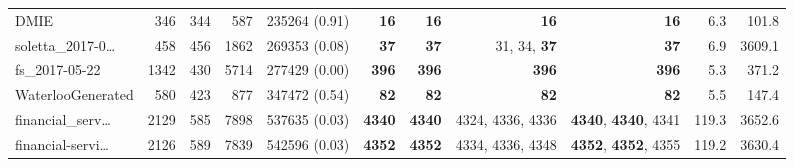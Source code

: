 \begin{table*}
\begin{tiny}
{{\begin{tabular}{lrrrrrrrrrr}
DMIE & \num[text-series-to-math=true]{346} & \num[text-series-to-math=true]{344} & \num[text-series-to-math=true]{587} & \num[text-series-to-math=true]{235264} (\num[text-series-to-math=true]{0.91}) & \textbf{\num[text-series-to-math=true]{16}} & \textbf{\num[text-series-to-math=true]{16}} & \textbf{\num[text-series-to-math=true]{16}} & \textbf{\num[text-series-to-math=true]{16}} & 6.3 & 101.8\\
soletta\_2017-0\ldots & \num[text-series-to-math=true]{458} & \num[text-series-to-math=true]{456} & \num[text-series-to-math=true]{1862} & \num[text-series-to-math=true]{269353} (\num[text-series-to-math=true]{0.08}) & \textbf{\num[text-series-to-math=true]{37}} & \textbf{\num[text-series-to-math=true]{37}} & \num[text-series-to-math=true]{31}, \num[text-series-to-math=true]{34}, \textbf{\num[text-series-to-math=true]{37}} & \textbf{\num[text-series-to-math=true]{37}} & 6.9 & 3609.1\\
fs\_2017-05-22 & \num[text-series-to-math=true]{1342} & \num[text-series-to-math=true]{430} & \num[text-series-to-math=true]{5714} & \num[text-series-to-math=true]{277429} (\num[text-series-to-math=true]{0.00}) & \textbf{\num[text-series-to-math=true]{396}} & \textbf{\num[text-series-to-math=true]{396}} & \textbf{\num[text-series-to-math=true]{396}} & \textbf{\num[text-series-to-math=true]{396}} & 5.3 & 371.2\\
WaterlooGenerated & \num[text-series-to-math=true]{580} & \num[text-series-to-math=true]{423} & \num[text-series-to-math=true]{877} & \num[text-series-to-math=true]{347472} (\num[text-series-to-math=true]{0.54}) & \textbf{\num[text-series-to-math=true]{82}} & \textbf{\num[text-series-to-math=true]{82}} & \textbf{\num[text-series-to-math=true]{82}} & \textbf{\num[text-series-to-math=true]{82}} & 5.5 & 147.4\\
financial\_serv\ldots & \num[text-series-to-math=true]{2129} & \num[text-series-to-math=true]{585} & \num[text-series-to-math=true]{7898} & \num[text-series-to-math=true]{537635} (\num[text-series-to-math=true]{0.03}) & \textbf{\num[text-series-to-math=true]{4340}} & \textbf{\num[text-series-to-math=true]{4340}} & \num[text-series-to-math=true]{4324}, \num[text-series-to-math=true]{4336}, \num[text-series-to-math=true]{4336} & \textbf{\num[text-series-to-math=true]{4340}}, \textbf{\num[text-series-to-math=true]{4340}}, \num[text-series-to-math=true]{4341} & 119.3 & 3652.6\\
financial-servi\ldots & \num[text-series-to-math=true]{2126} & \num[text-series-to-math=true]{589} & \num[text-series-to-math=true]{7839} & \num[text-series-to-math=true]{542596} (\num[text-series-to-math=true]{0.03}) & \textbf{\num[text-series-to-math=true]{4352}} & \textbf{\num[text-series-to-math=true]{4352}} & \num[text-series-to-math=true]{4334}, \num[text-series-to-math=true]{4336}, \num[text-series-to-math=true]{4348} & \textbf{\num[text-series-to-math=true]{4352}}, \textbf{\num[text-series-to-math=true]{4352}}, \num[text-series-to-math=true]{4355} & 119.2 & 3630.4\\

\end{tabular}}}
\end{tiny}
\end{table*}
